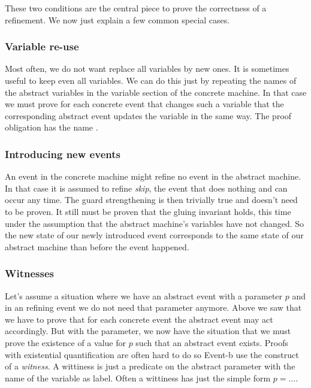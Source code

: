 These two conditions are the central piece to prove the correctness of a refinement. We now just explain a few
common special cases.

\subsubsection{Variable re-use}
\label{tutorial:variable_reuse}
Most often, we do not want replace all variables by new ones. It is sometimes useful to keep even all variables.
We can do this just by repeating the names of the abstract variables in the variable section of the concrete
machine. In that case we must prove for each concrete event that changes such a variable that the corresponding 
abstract event updates the variable in the same way.
The proof obligation has the name .

\subsubsection{Introducing new events}
\label{tutorial:skip}
An event in the concrete machine might refine no event in the abstract machine. In that case it is assumed
to refine \emph{skip}, the event that does nothing and can occur any time. 
The guard strengthening is then trivially true and doesn't need to be proven.
It still must be proven that the gluing invariant holds, this time under the assumption that the abstract machine's
variables have not changed. So the new state of our newly introduced event corresponds to the same state of
our abstract machine than before the event happened.

\subsubsection{Witnesses}
\label{tutorial:witnesses}
Let's assume a situation where we have an abstract event with a parameter $p$ and in an refining event we do not
need that parameter anymore.
Above we saw that we have to prove that for each concrete event the abstract event may act accordingly.
But with the parameter, we now have the situation that we must prove the existence of a value for $p$ such
that an abstract event exists. Proofs with existential quantification are often hard to do so Event-b 
use the construct of a \emph{witness}. A wittiness is just a predicate on the abstract parameter with the
name of the variable as label. Often a wittiness has just the simple form $p = \ldots$.


